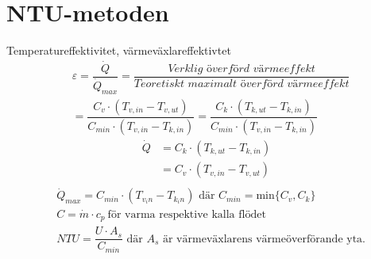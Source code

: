 	\section*{NTU-metoden}
	Temperatureffektivitet, värmeväxlareffektivtet
	\begin{align*}
		&\varepsilon = \dfrac{\dot{Q}}{\dot{Q}_{max}}=
		\dfrac{\textit{Verklig överförd värmeeffekt}}{\textit{Teoretiskt maximalt överförd värmeeffekt}} \\
		& = \dfrac{C_v \cdot (T_{v,in} - T_{v,ut})}{C_{min} \cdot (T_{v,in} - T_{k,in})}
		= \dfrac{C_k \cdot (T_{k,ut} - T_{k,in})}{C_{min} \cdot (T_{v,in} - T_{k,in})}
	\end{align*}
	\begin{align*}
		\dot{Q}&=C_k \cdot (T_{k,ut} - T_{k,in}) \\
		 &=C_v \cdot (T_{v,in} - T_{v,ut}) \\
	\end{align*}
	\vspace{-4.5em} %
	\begin{align*}
	&\dot{Q}_{max}=C_{min} \cdot (T_{v_in} - T_{k_in}) \text{ där } C_{min} = \text{min} \{C_v, C_k\} \\
	& C = \dot{m} \cdot c_p \ \text{för varma respektive kalla flödet} \\
	&\textit{NTU}=\dfrac{U \cdot A_s}{C_{min}} \text{ där } A_s \text{ är värmeväxlarens värmeöverförande yta.}
	\end{align*}
